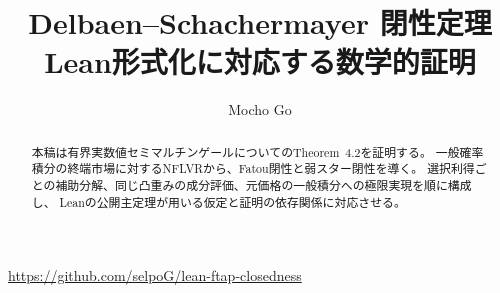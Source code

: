 \documentclass[uplatex,dvipdfmx,11pt,a4paper]{jsarticle}
\title{Delbaen--Schachermayer 閉性定理\\Lean形式化に対応する数学的証明}
\author{Mocho Go}
\date{}
\theoremstyle{definition}
\begin{document}
\maketitle
\begin{center}
\url{https://github.com/selpoG/lean-ftap-closedness}
\end{center}
\setcounter{tocdepth}{2}
\begin{abstract}
本稿は有界実数値セミマルチンゲールについてのTheorem~4.2を証明する。
一般確率積分の終端市場に対するNFLVRから、Fatou閉性と弱スター閉性を導く。
選択利得ごとの補助分解、同じ凸重みの成分評価、元価格の一般積分への極限実現を順に構成し、
Leanの公開主定理が用いる仮定と証明の依存関係に対応させる。
\end{abstract}
\tableofcontents









\appendix
\renewcommand{\thetheorem}{\Alph{section}.\arabic{theorem}}

\clearpage


\end{document}
